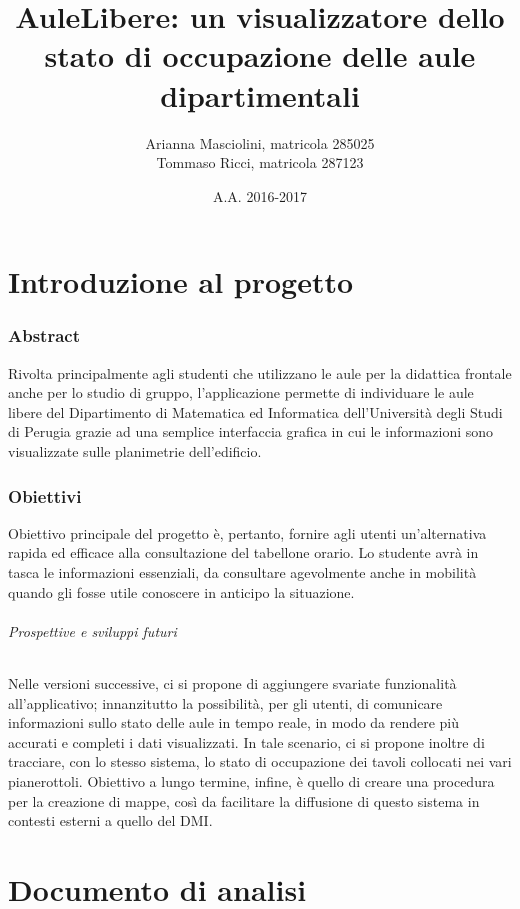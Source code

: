 \documentclass{article}
\title{{\huge AuleLibere: un visualizzatore dello stato di occupazione delle aule dipartimentali}}
\author{Arianna Masciolini, matricola 285025\\ Tommaso Ricci, matricola 287123}
\date{A.A. 2016-2017}
\begin{document}
	\maketitle
	\newpage
	\tableofcontents
	\newpage
	\part{Introduzione al progetto}
	\section{Abstract}
	Rivolta principalmente agli studenti che utilizzano le aule per la didattica frontale anche per lo studio di gruppo, l'applicazione permette di individuare le aule libere del Dipartimento di Matematica ed Informatica dell'Università degli Studi di Perugia grazie ad una semplice interfaccia grafica in cui le informazioni sono visualizzate sulle planimetrie dell'edificio.
	\section{Obiettivi}
	Obiettivo principale del progetto è, pertanto, fornire agli utenti un'alternativa rapida ed efficace alla consultazione del tabellone orario. Lo studente avrà in tasca le informazioni essenziali, da consultare agevolmente anche in mobilità quando gli fosse utile conoscere in anticipo la situazione.
	\paragraph{Prospettive e sviluppi futuri}
	Nelle versioni successive, ci si propone di aggiungere svariate funzionalità all'applicativo; innanzitutto la possibilità, per gli utenti, di comunicare informazioni sullo stato delle aule in tempo reale, in modo da rendere più accurati e completi i dati visualizzati. In tale scenario, ci si propone inoltre di tracciare, con lo stesso sistema, lo stato di occupazione dei tavoli collocati nei vari pianerottoli. Obiettivo a lungo termine, infine, è quello di creare una procedura per la creazione di mappe, così da facilitare la diffusione di questo sistema in contesti esterni a quello del DMI.
	\newpage
	\part{Documento di analisi}
\end{document}
